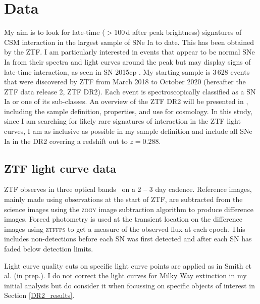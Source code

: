 \documentclass[a4paper,oneside,12pt, class=Latex/Classes/PhDthesisPSnPDF, crop=false]{standalone}
\begin{document}
\section{Data}
\label{DR2_data}
My aim is to look for late-time ($>$100\,d after peak brightness) signatures of CSM interaction in the largest sample of SNe Ia to date. This has been obtained by the ZTF. I am particularly interested in events that appear to be normal SNe Ia from their spectra and light curves around the peak but may display signs of late-time interaction, as seen in SN 2015cp \citep{2015cp}. My starting sample is 3\,628 events that were discovered by ZTF from March 2018 to October 2020 (hereafter the ZTF data release 2, ZTF DR2). Each event is spectroscopically classified as a SN Ia or one of its sub-classes. An overview of the ZTF DR2 will be presented in \citet{DR2_Overview}, including the sample definition, properties, and use for cosmology. In this study, since I am searching for likely rare signatures of interaction in the ZTF light curves, I am as inclusive as possible in my sample definition and include all SNe Ia in the DR2 covering a redshift out to $z = 0.288$. 

\subsection{ZTF light curve data}
\label{lc_data}
ZTF observes in three optical bands \ztfg\ztfr\ztfi\ on a 2 -- 3 day cadence. Reference images, mainly made using observations at the start of ZTF, are subtracted from the science images using the \textsc{zogy} image subtraction algorithm \citep{ZOGY} to produce difference images. Forced photometry is used at the transient location on the difference images using \textsc{ztffps} \citep{ztffps} to get a measure of the observed flux at each epoch. This includes non-detections before each SN was first detected and after each SN has faded below detection limits.

 Light curve quality cuts on specific light curve points are applied as in Smith et al. (in prep.). I do not correct the light curves for Milky Way extinction in my initial analysis but do consider it when focussing on specific objects of interest in Section \ref{DR2_results}. 
\end{document}
